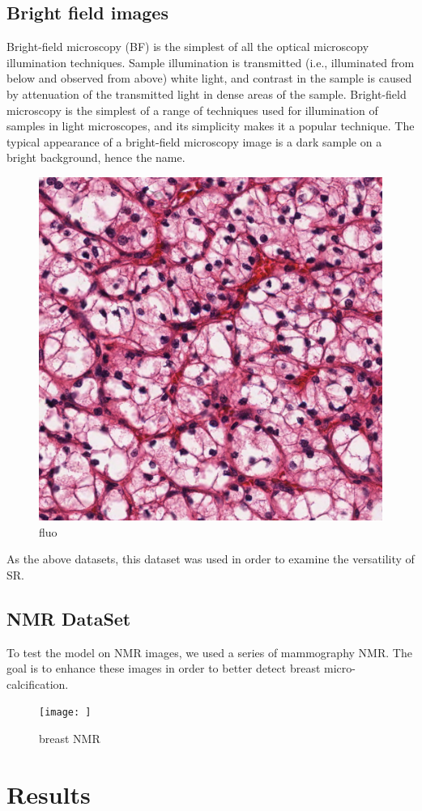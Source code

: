 \documentclass[a4paper, 10pt]{book}
\begin{document}
\section {Bright field images}
Bright-field microscopy (BF) is the simplest of all the optical microscopy illumination techniques. Sample illumination is transmitted (i.e., illuminated from below and observed from above) white light, and contrast in the sample is caused by attenuation of the transmitted light in dense areas of the sample. Bright-field microscopy is the simplest of a range of techniques used for illumination of samples in light microscopes, and its simplicity makes it a popular technique. The typical appearance of a bright-field microscopy image is a dark sample on a bright background, hence the name.
\begin{figure}[H]
    \centering
    \includegraphics[scale=0.25]{TCGA-B0-5698-01Z-00-DX1.jpeg}
    \caption{fluo}
    \label{fluo_1}
\end{figure}
As the above datasets, this dataset was used in order to examine the versatility of SR.

\section{NMR DataSet}
To test the model on NMR images, we used a series of mammography NMR.
The goal is to enhance these images in order to better detect breast micro-calcification.
\begin{figure}[H]
    \centering
    \texttt{[image: ]}
    \caption{breast NMR}
    \label{breast NMR}
\end{figure}

\chapter{Results}



\newpage
\thispagestyle{empty}
\listoffigures

\newpage
\nocite{*}


\end{document}
